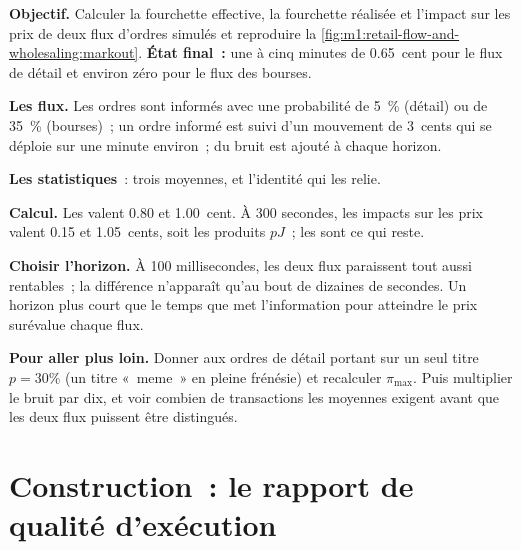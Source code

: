 \begin{tutorial}
\textbf{Objectif.} Calculer la fourchette effective, la fourchette réalisée et l'impact sur les prix
de deux flux d'ordres simulés et reproduire
la \cref{fig:m1:retail-flow-and-wholesaling:markout}. \textbf{État final~:} une
 à cinq minutes de 0.65~cent pour le flux de détail et
environ zéro pour le flux des bourses.
\begin{tutsteps}
\item \textbf{Les flux.} Les ordres sont informés avec une probabilité de 5~\% (détail)
ou de 35~\% (bourses)~; un ordre informé est suivi d'un mouvement de 3~cents qui
se déploie sur une minute environ~; du bruit est ajouté à chaque horizon.
\label{lst:m1:retail-flow-and-wholesaling:flows}
\item \textbf{Les statistiques}~: trois moyennes, et l'identité qui les relie.
\label{lst:m1:retail-flow-and-wholesaling:stats}
\item \textbf{Calcul.} Les  valent 0.80 et 1.00~cent. À 300
secondes, les impacts sur les prix valent 0.15 et 1.05~cents, soit les produits $pJ$~; les
 sont ce qui reste.
\item \textbf{Choisir l'horizon.} À 100 millisecondes, les deux flux paraissent
tout aussi rentables~; la différence n'apparaît qu'au bout de dizaines de secondes. Un
horizon plus court que le temps que met l'information pour atteindre le
prix surévalue chaque flux.
\end{tutsteps}
\textbf{Pour aller plus loin.} Donner aux ordres de détail portant sur un seul titre $p = 30\%$ (un
titre «~meme~» en pleine frénésie) et recalculer $\pi_{\max}$. Puis multiplier le bruit
par dix, et voir combien de transactions les moyennes exigent avant que les deux flux
puissent être distingués.
\end{tutorial}

\section{Construction~: le rapport de qualité d'exécution}\label{bld:m1:retail-flow-and-wholesaling:report}

